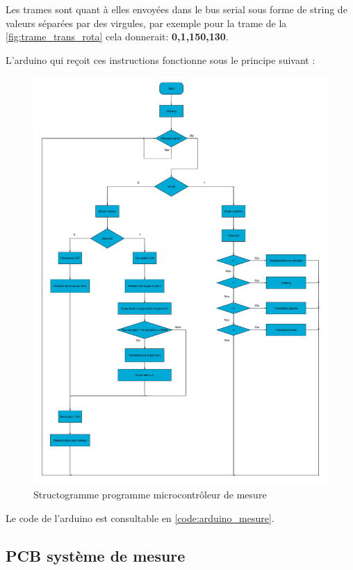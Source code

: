 Les trames sont quant à elles envoyées dans le bus serial sous forme de string de valeurs séparées par des virgules, par exemple pour la trame
de la \autoref{fig:trame_trans_rota} cela donnerait: \textbf{0,1,150,130}.

L'arduino qui reçoit ces instructions fonctionne sous le principe suivant :

\begin{figure}[H]
    \centering
    \includegraphics[width = \textwidth]{assets/figures/ameliorations/Structogramme_arduino.pdf}
    \caption[Structogramme programme microcontrôleur de mesure]{Structogramme programme microcontrôleur de mesure}
\end{figure}
Le code de l'arduino est consultable en \autoref{code:arduino_mesure}.

\newpage
\subsection{PCB système de mesure}

